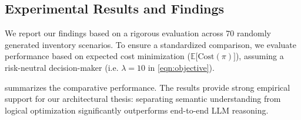 \subsection{Experimental Results and Findings}


{We report our findings based on a rigorous evaluation across $70$ randomly generated inventory scenarios. To ensure a standardized comparison, we evaluate performance based on expected cost minimization ($\mathds{E}\big[\mathrm{Cost}(\pi)\big]$), assuming a risk-neutral decision-maker (i.e. $\lambda = 10$ in \cref{eqn:objective}).}

{
 summarizes the comparative performance. The results provide strong empirical support for our architectural thesis: separating semantic understanding from logical optimization significantly outperforms end-to-end LLM reasoning.}

